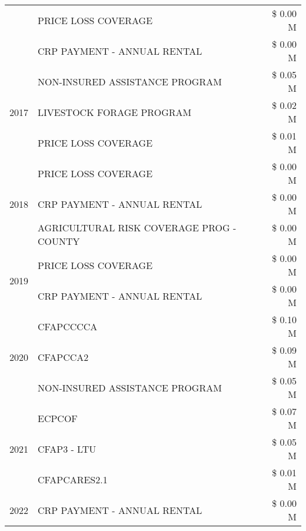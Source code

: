 \begin{tabular}{llr}
 & PRICE LOSS COVERAGE & \$ 0.00 M \\
 & CRP PAYMENT - ANNUAL RENTAL & \$ 0.00 M \\
\cline{1-3}
\multirow[t]{3}{*}{2017} & NON-INSURED ASSISTANCE PROGRAM & \$ 0.05 M \\
 & LIVESTOCK FORAGE PROGRAM & \$ 0.02 M \\
 & PRICE LOSS COVERAGE & \$ 0.01 M \\
\cline{1-3}
\multirow[t]{3}{*}{2018} & PRICE LOSS COVERAGE & \$ 0.00 M \\
 & CRP PAYMENT - ANNUAL RENTAL & \$ 0.00 M \\
 & AGRICULTURAL RISK COVERAGE PROG - COUNTY & \$ 0.00 M \\
\cline{1-3}
\multirow[t]{2}{*}{2019} & PRICE LOSS COVERAGE & \$ 0.00 M \\
 & CRP PAYMENT - ANNUAL RENTAL & \$ 0.00 M \\
\cline{1-3}
\multirow[t]{3}{*}{2020} & CFAPCCCCA & \$ 0.10 M \\
 & CFAPCCA2 & \$ 0.09 M \\
 & NON-INSURED ASSISTANCE PROGRAM & \$ 0.05 M \\
\cline{1-3}
\multirow[t]{3}{*}{2021} & ECPCOF & \$ 0.07 M \\
 & CFAP3 - LTU & \$ 0.05 M \\
 & CFAPCARES2.1 & \$ 0.01 M \\
\cline{1-3}
2022 & CRP PAYMENT - ANNUAL RENTAL & \$ 0.00 M \\
\cline{1-3}
\bottomrule
\end{tabular}
